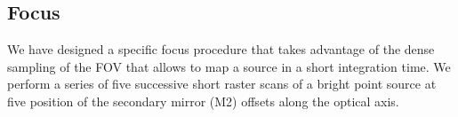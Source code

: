 
\subsection{Focus}
\label{se:axial_focus}

We have designed a specific focus procedure that takes
advantage of the dense sampling of the FOV that allows to map a source
in a short integration time. We perform a series of five successive
short raster scans of a bright point source at five position of the
secondary mirror (M2) offsets along the optical axis.%


